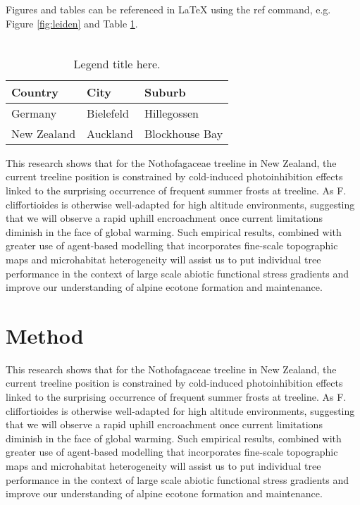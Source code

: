\documentclass[12pt]{article}
\begin{document}
Figures and tables can be referenced in LaTeX using the ref command, e.g. Figure \ref{fig:leiden} and Table \ref{tab:citytable}.\\
\\


\begin{table}[ht]
\caption{\label{tab:citytable} Legend title here.}
\centering
\begin{tabular}{|l|l|l|}  %
\hline
Country & City & Suburb \\
\hline
Germany & Bielefeld & Hillegossen \\
\hline
New Zealand & Auckland & Blockhouse Bay \\
\hline
\end{tabular}
\end{table}

\noindent This research shows that for the Nothofagaceae treeline in New Zealand, the current treeline position is constrained by cold-induced photoinhibition effects linked to the surprising occurrence of frequent summer frosts at treeline. As F. cliffortioides is otherwise well-adapted for high altitude environments, suggesting that we will observe a rapid uphill encroachment once current limitations diminish in the face of global warming. Such empirical results, combined with greater use of agent-based modelling that incorporates fine-scale topographic maps and microhabitat heterogeneity will assist us to put individual tree performance in the context of large scale abiotic functional stress gradients and improve our understanding of alpine ecotone formation and maintenance.







\section{Method}


\noindent This research shows that for the Nothofagaceae treeline in New Zealand, the current treeline position is constrained by cold-induced photoinhibition effects linked to the surprising occurrence of frequent summer frosts at treeline. As F. cliffortioides is otherwise well-adapted for high altitude environments, suggesting that we will observe a rapid uphill encroachment once current limitations diminish in the face of global warming. Such empirical results, combined with greater use of agent-based modelling that incorporates fine-scale topographic maps and microhabitat heterogeneity will assist us to put individual tree performance in the context of large scale abiotic functional stress gradients and improve our understanding of alpine ecotone formation and maintenance.
\end{document}

